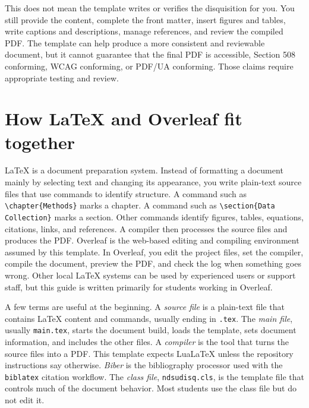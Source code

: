 This does not mean the template writes or verifies the disquisition for you. You still provide the content, complete the front matter, insert figures and tables, write captions and descriptions, manage references, and review the compiled PDF. The template can help produce a more consistent and reviewable document, but it cannot guarantee that the final PDF is accessible, Section 508 conforming, WCAG conforming, or PDF/UA conforming. Those claims require appropriate testing and review.

\section{How \LaTeX{} and Overleaf fit together}
\label{sec:latex-overleaf}

\LaTeX{} is a document preparation system. Instead of formatting a document mainly by selecting text and changing its appearance, you write plain-text source files that use commands to identify structure. A command such as \verb|\chapter{Methods}| marks a chapter. A command such as \verb|\section{Data Collection}| marks a section. Other commands identify figures, tables, equations, citations, links, and references. A compiler then processes the source files and produces the PDF. Overleaf is the web-based editing and compiling environment assumed by this template. In Overleaf, you edit the project files, set the compiler, compile the document, preview the PDF, and check the log when something goes wrong. Other local \LaTeX{} systems can be used by experienced users or support staff, but this guide is written primarily for students working in Overleaf.

A few terms are useful at the beginning. A \textit{source file} is a plain-text file that contains \LaTeX{} content and commands, usually ending in \texttt{.tex}. The \textit{main file}, usually \texttt{main.tex}, starts the document build, loads the template, sets document information, and includes the other files. A \textit{compiler} is the tool that turns the source files into a PDF. This template expects LuaLaTeX unless the repository instructions say otherwise. \textit{Biber} is the bibliography processor used with the \texttt{biblatex} citation workflow. The \textit{class file}, \texttt{ndsudisq.cls}, is the template file that controls much of the document behavior. Most students use the class file but do not edit it.

